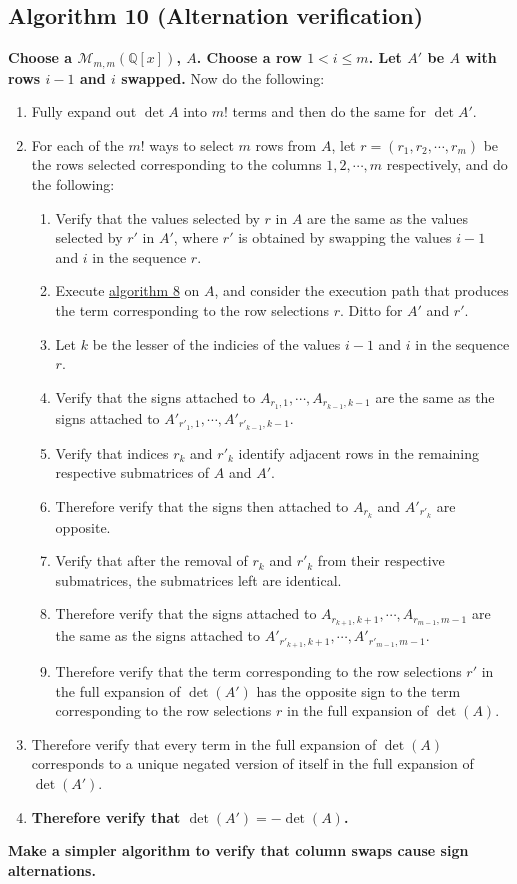 \documentclass[twocolumn]{article}
\begin{document}
		\subsection{Algorithm 10 (Alternation verification)}\label{sec:algorithm 10}
			\textbf{Choose a $\mathcal{M}_{m,m}(\mathbb{Q}[x])$, $A$. Choose a row $1<i\le m$. Let $A'$ be $A$ with rows $i-1$ and $i$ swapped.} Now do the following:
			\begin{enumerate}
				\item Fully expand out $\det A$ into $m!$ terms and then do the same for $\det A'$.
				\item For each of the $m!$ ways to select $m$ rows from $A$, let $r=(r_1, r_2, \cdots, r_m)$ be the rows selected corresponding to the columns $1, 2, \cdots, m$ respectively, and do the following:
				\begin{enumerate}
					\item Verify that the values selected by $r$ in $A$ are the same as the values selected by $r'$ in $A'$, where $r'$ is obtained by swapping the values $i-1$ and $i$ in the sequence $r$.
					\item Execute \hyperref[sec:algorithm 8]{algorithm 8} on $A$, and consider the execution path that produces the term corresponding to the row selections $r$. Ditto for $A'$ and $r'$.
					\item Let $k$ be the lesser of the indicies of the values $i-1$ and $i$ in the sequence $r$.
					\item Verify that the signs attached to $A_{r_1,1},\cdots,A_{r_{k-1},k-1}$ are the same as the signs attached to $A'_{r'_1,1},\cdots,A'_{r'_{k-1},k-1}$.
					\item Verify that indices $r_k$ and $r'_k$ identify adjacent rows in the remaining respective submatrices of $A$ and $A'$.
					\item Therefore verify that the signs then attached to $A_{r_k}$ and $A'_{r'_k}$ are opposite.
					\item Verify that after the removal of $r_k$ and $r'_k$ from their respective submatrices, the submatrices left are identical.
					\item Therefore verify that the signs attached to $A_{r_{k+1},k+1},\cdots,A_{r_{m-1},m-1}$ are the same as the signs attached to $A'_{r'_{k+1},k+1},\cdots,A'_{r'_{m-1},m-1}$.
					\item Therefore verify that the term corresponding to the row selections $r'$ in the full expansion of $\det(A')$ has the opposite sign to the term corresponding to the row selections $r$ in the full expansion of $\det(A)$.
				\end{enumerate}
				\item Therefore verify that every term in the full expansion of $\det(A)$ corresponds to a unique negated version of itself in the full expansion of $\det(A')$.
				\item\textbf{Therefore verify that $\det(A')=-\det(A)$.}
			\end{enumerate}
			\textbf{Make a simpler algorithm to verify that column swaps cause sign alternations.}
\end{document}
